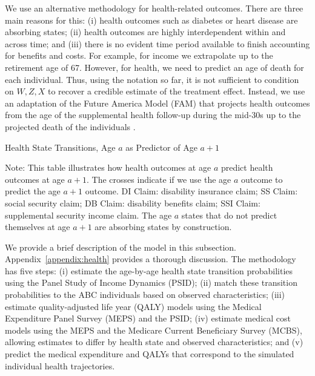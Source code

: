 \noindent We use an alternative methodology for health-related outcomes. There are three main reasons for this: (i) health outcomes such as diabetes or heart disease are absorbing states; (ii) health outcomes are highly interdependent within and across time; and (iii) there is no evident time period available to finish accounting for benefits and costs. For example, for income we extrapolate up to the retirement age of 67. However, for health, we need to predict an age of death for each individual. Thus, using the notation so far, it is not sufficient to condition on $W, Z, X$ to recover a credible estimate of the treatment effect. Instead, we use an adaptation of the Future America Model (FAM) that projects health outcomes from the age of the supplemental health follow-up during the mid-30s up to the projected death of the individuals \citep{Goldman_etal_2015_Future-Elderly-Model-Report}. \\

\begin{table}
\begin{threeparttable}
\caption{Health State Transitions, Age $a$ as Predictor of Age $a+1$}\label{table:transition}
\scriptsize

\begin{tablenotes}
\footnotesize
\item Note: This table illustrates how health outcomes at age $a$ predict health outcomes at age $a+1$. The crosses indicate if we use the age $a$ outcome to predict the age $a+1$ outcome. DI Claim: disability insurance claim; SS Claim: social security claim; DB Claim: disability benefits claim; SSI Claim: supplemental security income claim. The age $a$ states that do not predict themselves at age $a+1$ are absorbing states by construction.
\end{tablenotes}
\end{threeparttable}
\end{table}

\noindent We provide a brief description of the model in this subsection. Appendix~\ref{appendix:health} provides a thorough discussion. The methodology has five steps: (i) estimate the age-by-age health state transition probabilities using the Panel Study of Income Dynamics (PSID); (ii) match these transition probabilities to the ABC individuals based on observed characteristics; (iii) estimate quality-adjusted life year (QALY) models using the Medical Expenditure Panel Survey (MEPS) and the PSID; (iv) estimate medical cost models using the MEPS and the Medicare Current Beneficiary Survey (MCBS), allowing estimates to differ by health state and observed characteristics; and (v) predict the medical expenditure and QALYs that correspond to the simulated individual health trajectories. \\

